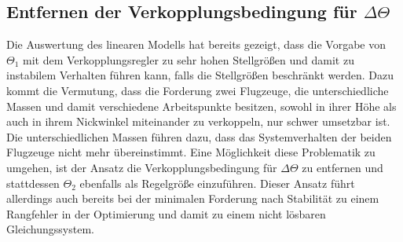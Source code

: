 \subsection{Entfernen der Verkopplungsbedingung für $\Delta \Theta$}
Die Auswertung des linearen Modells hat bereits gezeigt, dass die Vorgabe von $\Theta_1$ mit dem Verkopplungsregler zu sehr hohen Stellgrößen und damit zu instabilem Verhalten führen kann, falls die Stellgrößen beschränkt werden. Dazu kommt die Vermutung, dass die Forderung zwei Flugzeuge, die unterschiedliche Massen und damit verschiedene Arbeitspunkte besitzen, sowohl in ihrer Höhe als auch in ihrem Nickwinkel miteinander zu verkoppeln, nur schwer umsetzbar ist. Die unterschiedlichen Massen führen dazu, dass das Systemverhalten der beiden Flugzeuge nicht mehr übereinstimmt. Eine Möglichkeit diese Problematik zu umgehen, ist der Ansatz die Verkopplungsbedingung für $\Delta \Theta$ zu entfernen und stattdessen $\Theta_2$ ebenfalls als Regelgröße einzuführen. Dieser Ansatz führt allerdings auch bereits bei der minimalen Forderung nach Stabilität zu einem Rangfehler in der Optimierung und damit zu einem nicht lösbaren Gleichungssystem.